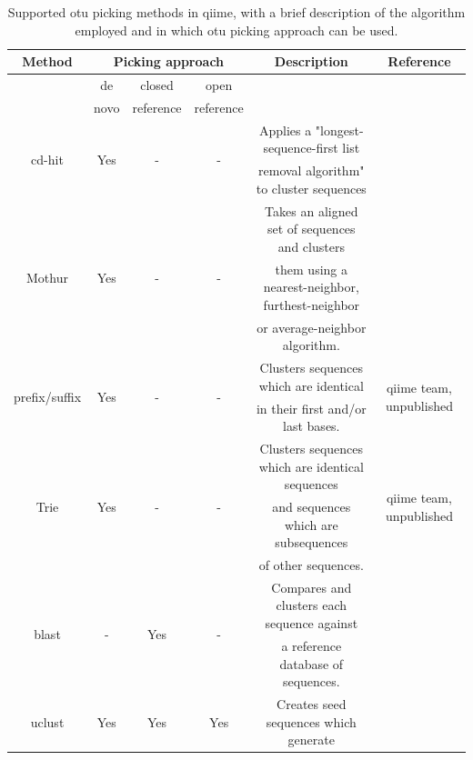 \begin{table}
\centering
\caption[Supported \gls{otu} picking methods in \gls{qiime}, with a brief description of the algorithm employed and in which \gls{otu} picking approach can be used.]{Supported \gls{otu} picking methods in \gls{qiime}, with a brief description of the algorithm employed and in which \gls{otu} picking approach can be used.}\label{btable2}
\renewcommand{\arraystretch}{0.6}%
\begin{tabular*}{\textwidth}{cccccc}
\toprule
Method & \multicolumn{3}{c}{Picking approach} & Description & Reference \\
\midrule
& de & closed & open & & \\
& novo & reference & reference & & \\
\midrule
\multirow{2}{*}{cd-hit} & \multirow{2}{*}{Yes} & \multirow{2}{*}{-} & \multirow{2}{*}{-} & Applies a "longest-sequence-first list & \multirow{2}{*}{\cite{Li2006, Li2001}}\\
& & & & removal algorithm" to cluster sequences & \\
\midrule
\multirow{3}{*}{Mothur} & \multirow{3}{*}{Yes} & \multirow{3}{*}{-} & \multirow{3}{*}{-} & Takes an aligned set of sequences and clusters & \multirow{3}{*}{\cite{Schloss2009}}\\
& & & & them using a nearest-neighbor, furthest-neighbor & \\
& & & & or average-neighbor algorithm. & \\
\midrule
\multirow{2}{*}{prefix/suffix} & \multirow{2}{*}{Yes} & \multirow{2}{*}{-} & \multirow{2}{*}{-} & Clusters sequences which are identical & \multirow{2}{*}{\gls{qiime} team, unpublished}\\
& & & & in their first and/or last bases. & \\
\midrule
\multirow{3}{*}{Trie} & \multirow{3}{*}{Yes} & \multirow{3}{*}{-} & \multirow{3}{*}{-} & Clusters sequences which are identical sequences & \multirow{3}{*}{\gls{qiime} team, unpublished}\\
& & & & and sequences which are subsequences & \\
& & & & of other sequences. & \\
\midrule
\multirow{2}{*}{blast} & \multirow{2}{*}{-} & \multirow{2}{*}{Yes} & \multirow{2}{*}{-} & Compares and clusters each sequence against & \multirow{2}{*}{\cite{Altschul1990}}\\
& & & & a reference database of sequences. & \\
\midrule
\multirow{2}{*}{uclust} & \multirow{2}{*}{Yes} & \multirow{2}{*}{Yes} & \multirow{2}{*}{Yes} & Creates seed sequences which generate & \multirow{2}{*}{\cite{Edgar2010}}\\

\end{tabular*}
\end{table}
